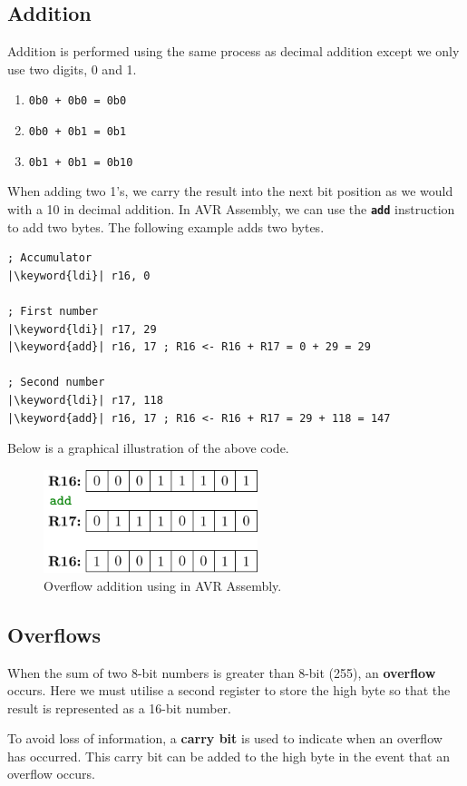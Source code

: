 \documentclass{report}
\newcommand{\keyword}[1]{\textcolor[rgb]{0.00,0.50,0.00}{\textbf{#1}}}
\newcommand{\keywordinline}[1]{\textcolor[rgb]{0.00,0.50,0.00}{\textbf{\texttt{#1}}}}
\begin{document}
\subsection{Addition}
Addition is performed using the same process as decimal addition except we only use two digits, 0 and 1.
\begin{enumerate}
    \item \texttt{0b0 + 0b0 = 0b0}
    \item \texttt{0b0 + 0b1 = 0b1}
    \item \texttt{0b1 + 0b1 = 0b10}
\end{enumerate}
When adding two 1's, we carry the result into the next bit position as we would with a 10 in decimal addition.
In AVR Assembly, we can use the \keywordinline{add} instruction to add two bytes. The following
example adds two bytes.
\begin{verbatim}
; Accumulator
|\keyword{ldi}| r16, 0

; First number
|\keyword{ldi}| r17, 29
|\keyword{add}| r16, 17 ; R16 <- R16 + R17 = 0 + 29 = 29

; Second number
|\keyword{ldi}| r17, 118
|\keyword{add}| r16, 17 ; R16 <- R16 + R17 = 29 + 118 = 147
\end{verbatim}
Below is a graphical illustration of the above code.
\begin{figure}[H]
    \centering
    \includegraphics[height = 3cm, keepaspectratio = true]{figures/add.pdf}
    \caption{Overflow addition using \keyword{} in AVR Assembly.} %
\end{figure}
\subsection{Overflows}
When the sum of two 8-bit numbers is greater than 8-bit (255), an \textbf{overflow} occurs.
Here we must utilise a second register to store the high byte so that the result is represented as
a 16-bit number.

To avoid loss of information, a \textbf{carry bit} is used to indicate when an overflow has occurred.
This carry bit can be added to the high byte in the event that an overflow occurs.
\end{document}
